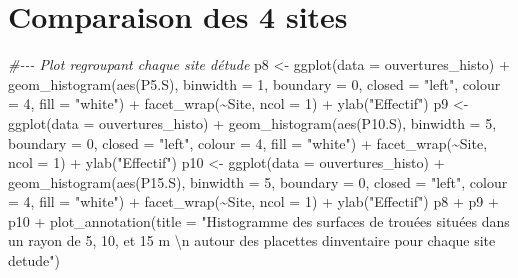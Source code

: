 \documentclass[
  12pt,
  american,
  a4paper,
  extrafontsizes,onecolumn,openright
  ]{memoir}
\newenvironment{Shaded}{\begin{snugshade}}{\end{snugshade}}
\newcommand{\AttributeTok}[1]{\textcolor[rgb]{0.77,0.63,0.00}{#1}}
\newcommand{\CommentTok}[1]{\textcolor[rgb]{0.56,0.35,0.01}{\textit{#1}}}
\newcommand{\DecValTok}[1]{\textcolor[rgb]{0.00,0.00,0.81}{#1}}
\newcommand{\FunctionTok}[1]{\textcolor[rgb]{0.00,0.00,0.00}{#1}}
\newcommand{\NormalTok}[1]{#1}
\newcommand{\OtherTok}[1]{\textcolor[rgb]{0.56,0.35,0.01}{#1}}
\newcommand{\SpecialCharTok}[1]{\textcolor[rgb]{0.00,0.00,0.00}{#1}}
\newcommand{\StringTok}[1]{\textcolor[rgb]{0.31,0.60,0.02}{#1}}
\newlength{\rf}
\begin{document}
\hypertarget{comparaison-des-4-sites}{%
\section{Comparaison des 4 sites}\label{comparaison-des-4-sites}}

\scriptsize

\begin{Shaded}
\begin{Highlighting}[]
\CommentTok{\#{-}{-}{-} Plot regroupant chaque site d\textquotesingle{}étude}
\NormalTok{p8 }\OtherTok{\textless{}{-}} \FunctionTok{ggplot}\NormalTok{(}\AttributeTok{data =}\NormalTok{ ouvertures\_histo) }\SpecialCharTok{+} \FunctionTok{geom\_histogram}\NormalTok{(}\FunctionTok{aes}\NormalTok{(P5.S),}
    \AttributeTok{binwidth =} \DecValTok{1}\NormalTok{, }\AttributeTok{boundary =} \DecValTok{0}\NormalTok{, }\AttributeTok{closed =} \StringTok{"left"}\NormalTok{, }\AttributeTok{colour =} \DecValTok{4}\NormalTok{,}
    \AttributeTok{fill =} \StringTok{"white"}\NormalTok{) }\SpecialCharTok{+} \FunctionTok{facet\_wrap}\NormalTok{(}\SpecialCharTok{\textasciitilde{}}\NormalTok{Site, }\AttributeTok{ncol =} \DecValTok{1}\NormalTok{) }\SpecialCharTok{+} \FunctionTok{ylab}\NormalTok{(}\StringTok{"Effectif"}\NormalTok{)}
\NormalTok{p9 }\OtherTok{\textless{}{-}} \FunctionTok{ggplot}\NormalTok{(}\AttributeTok{data =}\NormalTok{ ouvertures\_histo) }\SpecialCharTok{+} \FunctionTok{geom\_histogram}\NormalTok{(}\FunctionTok{aes}\NormalTok{(P10.S),}
    \AttributeTok{binwidth =} \DecValTok{5}\NormalTok{, }\AttributeTok{boundary =} \DecValTok{0}\NormalTok{, }\AttributeTok{closed =} \StringTok{"left"}\NormalTok{, }\AttributeTok{colour =} \DecValTok{4}\NormalTok{,}
    \AttributeTok{fill =} \StringTok{"white"}\NormalTok{) }\SpecialCharTok{+} \FunctionTok{facet\_wrap}\NormalTok{(}\SpecialCharTok{\textasciitilde{}}\NormalTok{Site, }\AttributeTok{ncol =} \DecValTok{1}\NormalTok{) }\SpecialCharTok{+} \FunctionTok{ylab}\NormalTok{(}\StringTok{"Effectif"}\NormalTok{)}
\NormalTok{p10 }\OtherTok{\textless{}{-}} \FunctionTok{ggplot}\NormalTok{(}\AttributeTok{data =}\NormalTok{ ouvertures\_histo) }\SpecialCharTok{+} \FunctionTok{geom\_histogram}\NormalTok{(}\FunctionTok{aes}\NormalTok{(P15.S),}
    \AttributeTok{binwidth =} \DecValTok{5}\NormalTok{, }\AttributeTok{boundary =} \DecValTok{0}\NormalTok{, }\AttributeTok{closed =} \StringTok{"left"}\NormalTok{, }\AttributeTok{colour =} \DecValTok{4}\NormalTok{,}
    \AttributeTok{fill =} \StringTok{"white"}\NormalTok{) }\SpecialCharTok{+} \FunctionTok{facet\_wrap}\NormalTok{(}\SpecialCharTok{\textasciitilde{}}\NormalTok{Site, }\AttributeTok{ncol =} \DecValTok{1}\NormalTok{) }\SpecialCharTok{+} \FunctionTok{ylab}\NormalTok{(}\StringTok{"Effectif"}\NormalTok{)}
\NormalTok{p8 }\SpecialCharTok{+}\NormalTok{ p9 }\SpecialCharTok{+}\NormalTok{ p10 }\SpecialCharTok{+} \FunctionTok{plot\_annotation}\NormalTok{(}\AttributeTok{title =} \StringTok{"Histogramme des surfaces de trouées situées dans un rayon de 5, 10, et 15 m }\SpecialCharTok{\textbackslash{}n}\StringTok{ autour des placettes d\textquotesingle{}inventaire pour chaque site d\textquotesingle{}etude"}\NormalTok{)}
\end{Highlighting}
\end{Shaded}
\end{document}
